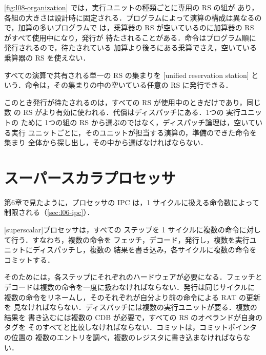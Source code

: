 \documentclass[../main.tex]{subfiles}
\begin{document}
\cref{fig:l08-organization} では，実行ユニットの種類ごとに専用の RS の組が
あり，各組の大きさは設計時に固定される．プログラムによって演算の構成は異なるので，加算の多いプログラムで
は，乗算器の RS が空いているのに加算器の RS がすべて使用中になり，発行が
待たされることがある．命令はプログラム順に発行されるので，待たされている
加算より後ろにある乗算でさえ，空いている乗算器の RS を使えない．

\begin{definition}[統合リザベーションステーション]
  \label{def:l08-unified}
  すべての演算で共有される単一の RS の集まりを
  [unified reservation station]%
  という．命令は，その集まりの中の空いている任意の RS に発行できる．
\end{definition}

このとき発行が待たされるのは，すべての RS が使用中のときだけであり，同じ数
の RS がより有効に使われる．代償はディスパッチにある．1つの
実行ユニットの
ために 1つの組の RS から選ぶのではなく，ディスパッチ論理は，空いている実行
ユニットごとに，そのユニットが担当する演算の，準備のできた命令を集まり
全体から探し出し，その中から選ばなければならない．

\section{スーパースカラプロセッサ}
\label{sec:l08-superscalar}

第6章で見たように，プロセッサの IPC は，1 サイクルに扱える命令数によって
制限される（\cref{sec:l06-ipc}）．

\begin{definition}[スーパースカラプロセッサ]
  \label{def:l08-superscalar}
  [superscalar]プロセッサは，すべての
  ステップを 1 サイクルに複数の命令に対して行う．すなわち，複数の命令を
  フェッチ，デコード，発行し，複数を実行ユニットにディスパッチし，複数の
  結果を書き込み，各サイクルに複数の命令をコミットする．
\end{definition}

そのためには，各ステップにそれぞれのハードウェアが必要になる．フェッチと
デコードは複数の命令を一度に扱わなければならない．発行は同じサイクルに
複数の命令をリネームし，そのそれぞれが自分より前の命令による RAT の更新を
見なければならない．ディスパッチには複数の実行ユニットが要る．複数の結果を
書き込むには複数の CDB が必要で，すべての RS のオペランドが自身のタグを
そのすべてと比較しなければならない．コミットは，コミットポインタの位置の
複数のエントリを調べ，複数のレジスタに書き込まなければならない．
\end{document}
